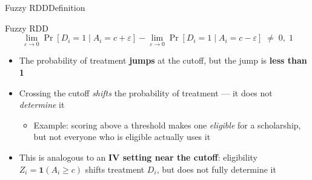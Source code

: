 \documentclass[hyperref={pdfpagelabels=false}]{beamer}
\begin{document}
\begin{frame}{Fuzzy RDD}{Definition}

\begin{block}{Fuzzy RDD}
\begin{equation*}
    \lim_{\varepsilon\rightarrow 0}
    \Pr[D_i=1\mid A_i=c+\varepsilon]
    -
    \lim_{\varepsilon\rightarrow 0}
    \Pr[D_i=1\mid A_i=c-\varepsilon]
    \;\neq\; 0,\;1
\end{equation*}
\end{block}

\vspace{0.2cm}
\begin{itemize}
    \item The probability of treatment \textbf{jumps} at the cutoff,
          but the jump is \textbf{less than 1}

    \vspace{0.2cm}
    \item Crossing the cutoff \emph{shifts} the probability of treatment ---
          it does not \emph{determine} it
    \vspace{0.1cm}
    \begin{itemize}
        \item Example: scoring above a threshold makes one
              \emph{eligible} for a scholarship, but not everyone
              who is eligible actually uses it
    \end{itemize}

    \vspace{0.2cm}
    \item This is analogous to an \textbf{IV setting near the cutoff}:
          eligibility $Z_i = \mathbf{1}(A_i \geq c)$ shifts treatment
          $D_i$, but does not fully determine it
\end{itemize}
\end{frame}
\end{document}
